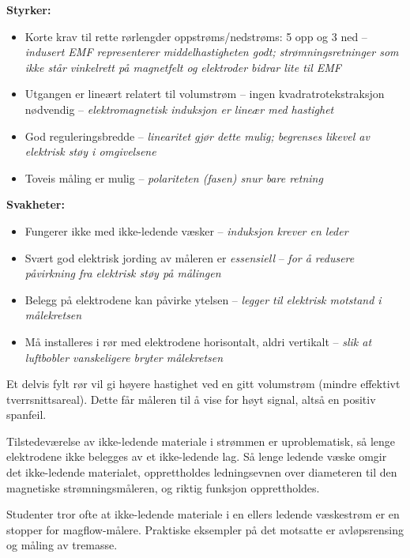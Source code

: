 







{\bf Styrker:}

\begin{itemize}
\item{} Korte krav til rette rørlengder oppstrøms/nedstrøms: 5 opp og 3 ned -- \textit{indusert EMF representerer middelhastigheten godt; strømningsretninger som ikke står vinkelrett på magnetfelt og elektroder bidrar lite til EMF}
\item{} Utgangen er lineært relatert til volumstrøm -- ingen kvadratrotekstraksjon nødvendig -- \textit{elektromagnetisk induksjon er lineær med hastighet}
\item{} God reguleringsbredde -- \textit{linearitet gjør dette mulig; begrenses likevel av elektrisk støy i omgivelsene}
\item{} Toveis måling er mulig -- \textit{polariteten (fasen) snur bare retning}
\end{itemize}

\vskip 10pt

{\bf Svakheter:}

\begin{itemize}
\item{} Fungerer ikke med ikke-ledende væsker -- \textit{induksjon krever en leder}
\item{} Svært god elektrisk jording av måleren er \textit{essensiell} -- \textit{for å redusere påvirkning fra elektrisk støy på målingen}
\item{} Belegg på elektrodene kan påvirke ytelsen -- \textit{legger til elektrisk motstand i målekretsen}
\item{} Må installeres i rør med elektrodene horisontalt, aldri vertikalt -- \textit{slik at luftbobler vanskeligere bryter målekretsen}
\end{itemize}

\vskip 10pt

Et delvis fylt rør vil gi høyere hastighet ved en gitt volumstrøm (mindre effektivt tverrsnittsareal). Dette får måleren til å vise for høyt signal, altså en positiv spanfeil.

\vskip 10pt

Tilstedeværelse av ikke-ledende materiale i strømmen er uproblematisk, så lenge elektrodene ikke belegges av et ikke-ledende lag. Så lenge ledende væske omgir det ikke-ledende materialet, opprettholdes ledningsevnen over diameteren til den magnetiske strømningsmåleren, og riktig funksjon opprettholdes.

Studenter tror ofte at ikke-ledende materiale i en ellers ledende væskestrøm er en stopper for magflow-målere. Praktiske eksempler på det motsatte er avløpsrensing og måling av tremasse.




